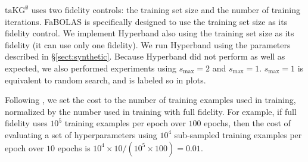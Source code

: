 \documentclass[letterpaper]{article}
\let\Section\S
\renewcommand{\S}{S}
\newcommand{\taKGE}{\text{taKG}^\emptyset}
\numberwithin{equation}{section}
\begin{document}
$\taKGE$ uses two fidelity controls: the training set size and the number of training iterations.  
FaBOLAS is specifically designed to use the training set size as its fidelity control.
We implement Hyperband also using the training set size as its fidelity (it can use only one fidelity).
We run Hyperband using the parameters described in \Section\ref{sect:synthetic}.  Because Hyperband did not perform as well as expected, we also performed experiments using $s_{\max} = 2$ and $s_{\max} = 1$.  $s_{\max} = 1$ is equivalent to random search, and is labeled so in plots.

Following \citet{li2016hyperband}, we set the cost to the number of training examples used in training, normalized by the number used in training with full fidelity. For example, if full fidelity uses $10^5$ training examples per epoch over $100$ epochs, then the cost of evaluating a set of hyperparameters using $10^4$ sub-sampled training examples per epoch over $10$ epochs is $10^4 \times 10 / (10^5 \times 100) = 0.01$. %
\end{document}
